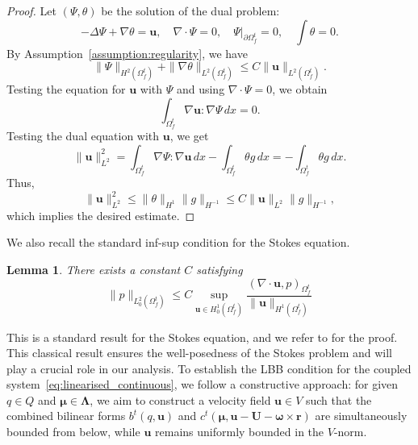 \documentclass{article}
\newcommand{\bU}{{\mathbf{U}}}
\newcommand{\bu}{{\mathbf{u}}}
\newcommand{\bomega}{{\boldsymbol{\omega}}}
\newtheorem{lemma}[theorem]{Lemma}
\begin{document}
\begin{proof}
    Let $(\Psi, \theta)$ be the solution of the dual problem:
    \begin{equation}
        -\Delta \Psi + \nabla \theta = \bu, \quad \nabla \cdot \Psi = 0, \quad \Psi|_{\partial\Omega_f^t} = 0, \quad \int \theta = 0.
    \end{equation}
    By Assumption~\ref{assumption:regularity}, we have
    \begin{equation}
        \|\Psi\|_{H^2(\Omega_f^t)} + \|\nabla \theta\|_{L^2(\Omega_f^t)} \leq C \|\bu\|_{L^2(\Omega_f^t)}.
    \end{equation}
    Testing the equation for $\bu$ with $\Psi$ and using $\nabla \cdot \Psi = 0$, we obtain
    \begin{equation}
        \int_{\Omega_f^t} \nabla \bu : \nabla \Psi \, dx = 0.
    \end{equation}
    Testing the dual equation with $\bu$, we get
    \begin{equation}
        \|\bu\|_{L^2}^2 = \int_{\Omega_f^t} \nabla \Psi : \nabla \bu \, dx - \int_{\Omega_f^t} \theta g \, dx = - \int_{\Omega_f^t} \theta g \, dx.
    \end{equation}
    Thus,
    \begin{equation}
        \|\bu\|_{L^2}^2 \leq \|\theta\|_{H^1} \|g\|_{H^{-1}} \leq C \|\bu\|_{L^2} \|g\|_{H^{-1}},
    \end{equation}
    which implies the desired estimate.
\end{proof}
We also recall the standard inf-sup condition for the Stokes equation.
\begin{lemma}\label{lemma:infsup_stationary_stokes}
    There exists a constant $C$ satisfying 
    \begin{equation}\label{eq:infsup}
        \|p\|_{L^2_0(\Omega_f^t)}\leq C\sup_{\bu\in H_0^1(\Omega_f^t)}\frac{(\nabla\cdot\bu,p)_{\Omega_f^t}}{\|\bu\|_{H^1(\Omega_f^t)}}
    \end{equation}
\end{lemma}
This is a standard result for the Stokes equation, and we refer to \cite{girault1979finite} for the proof. This classical result ensures the well-posedness of the Stokes problem and will play a crucial role in our analysis. To establish the LBB condition for the coupled system~\eqref{eq:linearised_continuous}, we follow a constructive approach: for given $q \in Q$ and $\boldsymbol{\mu} \in \boldsymbol{\Lambda}$, we aim to construct a velocity field $\bu \in V$ such that the combined bilinear forms $b^t(q,\bu)$ and $c^t(\boldsymbol{\mu},\bu - \bU - \bomega \times \mathbf{r})$ are simultaneously bounded from below, while $\bu$ remains uniformly bounded in the $V$-norm.
\end{document}
